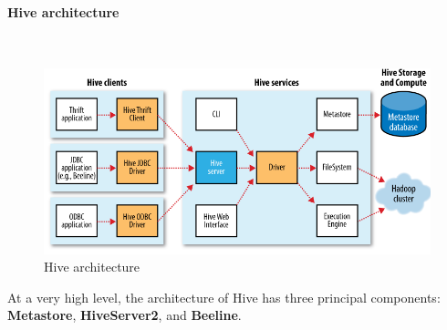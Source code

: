 \documentclass[12pt,english]{book}
\begin{document}
\paragraph{Hive architecture}\mbox{}\\

\begin{figure}[ht]
	\centering
	\includegraphics[width=\linewidth]{hiveSchema}
	\caption[Hive architecture]{Hive architecture \footnotemark}
\end{figure}


At a very high level, the architecture of Hive has three principal components: \textbf{Metastore}, \textbf{HiveServer2}, and \textbf{Beeline}.
\end{document}
